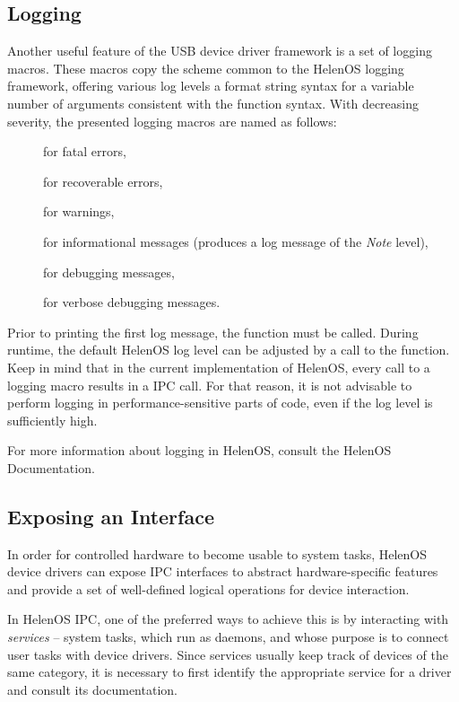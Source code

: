 \subsection{Logging}

Another useful feature of the USB device driver framework is a set of logging
macros. These macros copy the scheme common to the HelenOS logging framework,
offering various log levels a format string syntax for a variable number of
arguments consistent with the  function syntax. With decreasing
severity, the presented logging macros are named as follows:
~
\begin{description}
	\item[] for fatal errors,
	\item[] for recoverable errors,
	\item[] for warnings,
	\item[] for informational messages (produces a log
		message of the \textit{Note} level),
	\item[] for debugging messages,
	\item[] for verbose debugging messages.
\end{description}

Prior to printing the first log message, the  function must be
called. During runtime, the default HelenOS log level can be adjusted by a
call to the  function. Keep in mind that in the
current implementation of HelenOS, every call to a logging macro results in a
IPC call. For that reason, it is not advisable to perform logging in
performance-sensitive parts of code, even if the log level is sufficiently high.

For more information about logging in HelenOS, consult the HelenOS
Documentation.


\subsection{Exposing an Interface}

In order for controlled hardware to become usable to system tasks, HelenOS
device drivers can expose IPC interfaces to abstract hardware-specific features
and provide a set of well-defined logical operations for device interaction.

In HelenOS IPC, one of the preferred ways to achieve this is by interacting with
\textit{services} -- system tasks, which run as daemons, and whose purpose is to
connect user tasks with device drivers. Since services usually keep track of
devices of the same category, it is necessary to first identify the appropriate
service for a driver and consult its documentation.

